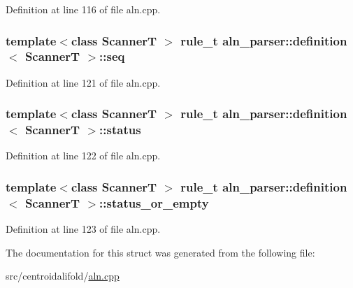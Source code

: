 Definition at line 116 of file aln.\+cpp.

\hypertarget{structaln__parser_1_1definition_a9f351b4a43adddc5d115367c48c9ec6c}{
\subsubsection[{seq}]{\setlength{\rightskip}{0pt plus 5cm}template$<$class Scanner\+T $>$ {\bf rule\+\_\+t} {\bf aln\+\_\+parser\+::definition}$<$ Scanner\+T $>$\+::seq}}\label{structaln__parser_1_1definition_a9f351b4a43adddc5d115367c48c9ec6c}


Definition at line 121 of file aln.\+cpp.

\hypertarget{structaln__parser_1_1definition_a4209d9d63ba0c23bda9e14357d05c77a}{
\subsubsection[{status}]{\setlength{\rightskip}{0pt plus 5cm}template$<$class Scanner\+T $>$ {\bf rule\+\_\+t} {\bf aln\+\_\+parser\+::definition}$<$ Scanner\+T $>$\+::status}}\label{structaln__parser_1_1definition_a4209d9d63ba0c23bda9e14357d05c77a}


Definition at line 122 of file aln.\+cpp.

\hypertarget{structaln__parser_1_1definition_a9e5a7d05e2136f5f5870d98e5c732394}{
\subsubsection[{status\+\_\+or\+\_\+empty}]{\setlength{\rightskip}{0pt plus 5cm}template$<$class Scanner\+T $>$ {\bf rule\+\_\+t} {\bf aln\+\_\+parser\+::definition}$<$ Scanner\+T $>$\+::status\+\_\+or\+\_\+empty}}\label{structaln__parser_1_1definition_a9e5a7d05e2136f5f5870d98e5c732394}


Definition at line 123 of file aln.\+cpp.



The documentation for this struct was generated from the following file\+:\begin{DoxyCompactItemize}
\item 
src/centroidalifold/\hyperlink{aln_8cpp}{aln.\+cpp}\end{DoxyCompactItemize}

